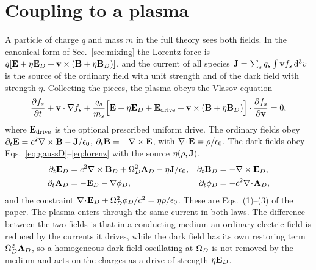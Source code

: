 \section{Coupling to a plasma}\label{sec:coupling}

A particle of charge $q$ and mass $m$ in the full theory sees both fields. In the canonical form of Sec.~\ref{sec:mixing} the Lorentz force is $q[\mathbf E+\eta\mathbf E_D+\mathbf v\times(\mathbf B+\eta\mathbf B_D)]$, and the current of all species $\mathbf J=\sum_sq_s\int\mathbf v f_s\,\mathrm{d}^3v$ is the source of the ordinary field with unit strength and of the dark field with strength $\eta$. Collecting the pieces, the plasma obeys the Vlasov equation
\begin{equation}
\frac{\partial f_s}{\partial t}+\mathbf v\cdot\nabla f_s+\frac{q_s}{m_s}\Big[\mathbf E+\eta\mathbf E_D+\mathbf E_{\rm drive}+\mathbf v\times(\mathbf B+\eta\mathbf B_D)\Big]\cdot\frac{\partial f_s}{\partial \mathbf v}=0 ,\label{eq:vlasovD}
\end{equation}
where $\mathbf E_{\rm drive}$ is the optional prescribed uniform drive. The ordinary fields obey $\partial_t\mathbf E=c^2\nabla\times\mathbf B-\mathbf J/\epsilon_0$, $\partial_t\mathbf B=-\nabla\times\mathbf E$, with $\nabla\!\cdot\!\mathbf E=\rho/\epsilon_0$. The dark fields obey Eqs.~\eqref{eq:gaussD}--\eqref{eq:lorenz} with the source $\eta(\rho,\mathbf J)$,
\begin{align}
\partial_t\mathbf E_D&=c^2\nabla\times\mathbf B_D+\Omega_D^2\mathbf A_D-\eta\mathbf J/\epsilon_0, & \partial_t\mathbf B_D&=-\nabla\times\mathbf E_D,\label{eq:darkMaxwell}\\
\partial_t\mathbf A_D&=-\mathbf E_D-\nabla\phi_D, & \partial_t\phi_D&=-c^2\nabla\!\cdot\!\mathbf A_D, \label{eq:darkPotentials}
\end{align}
and the constraint $\nabla\!\cdot\!\mathbf E_D+\Omega_D^2\phi_D/c^2=\eta\rho/\epsilon_0$. These are Eqs.~(1)--(3) of the paper. The plasma enters through the same current in both laws. The difference between the two fields is that in a conducting medium an ordinary electric field is reduced by the currents it drives, while the dark field has its own restoring term $\Omega_D^2\mathbf A_D$, so a homogeneous dark field oscillating at $\Omega_D$ is not removed by the medium and acts on the charges as a drive of strength $\eta\mathbf E_D$.

